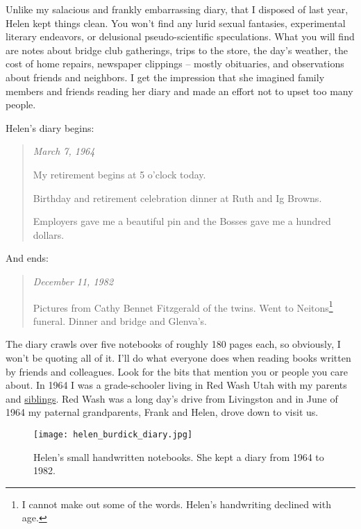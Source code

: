 Unlike my salacious and frankly embarrassing diary, that I disposed of
last year, Helen kept things clean. You won't find any lurid sexual
fantasies, experimental literary endeavors, or delusional
pseudo-scientific speculations. What you will find are notes about
bridge club gatherings, trips to the store, the day's weather, the cost
of home repairs, newspaper clippings -- mostly obituaries, and
observations about friends and neighbors. I get the impression that she
imagined family members and friends reading her diary and made an effort
not to upset too many people.

Helen's diary begins:

\begin{quote}
\emph{March 7, 1964}

My retirement begins at 5 o'clock today.

Birthday and retirement celebration dinner at Ruth and Ig Browns.

Employers gave me a beautiful pin and the Bosses gave me a hundred
dollars.
\end{quote}

And ends:

\begin{quote}
\emph{December 11, 1982}

Pictures from Cathy Bennet Fitzgerald of the twins. Went to
Neitons\footnote{I cannot make out some of the words. Helen's handwriting declined with
  age.
} funeral. Dinner and bridge and Glenva's.
\end{quote}

The diary crawls over five notebooks of roughly 180 pages each, so
obviously, I won't be quoting all of it. I'll do what everyone does when
reading books written by friends and colleagues. Look for the bits that
mention you or people you care about. In 1964 I was a grade-schooler
living in Red Wash Utah with my parents and \href{https://conceptcontrol.smugmug.com/People/The-Way-We-Were/i-ztMzpNx/A}{siblings}. Red Wash was a
long day's drive from Livingston and in June of 1964 my paternal
grandparents, Frank and Helen, drove down to visit us.


\captionsetup[figure]{labelformat=empty}
\begin{SCfigure}[30]
\centering
\texttt{[image: helen\_burdick\_diary.jpg]}
\caption[Helen's small handwritten notebooks]{Helen's small handwritten notebooks. She kept a diary from 1964 to 1982.}
\label{fig:7491x1}
\end{SCfigure}
 

